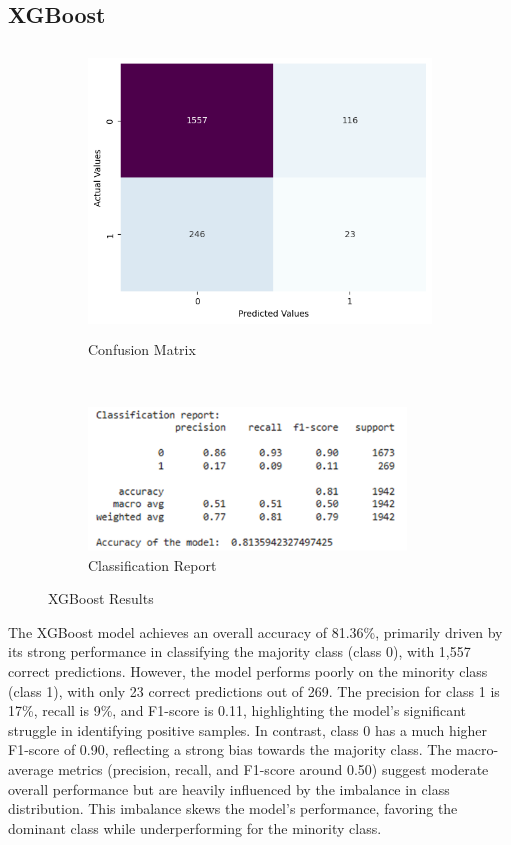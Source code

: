 \documentclass[12pt]{report}
\begin{document}
    \subsection{XGBoost}

    \begin{figure}[h!]
        \centering
        \begin{subfigure}[b]{0.5\textwidth}
            \centering
            \includegraphics[height=3in]{resources/pic/CM XGBoost.png}
            \caption{Confusion Matrix}
            \label{fig:XGBoost Confusion Matrix}
        \end{subfigure}%
        \\
        \begin{subfigure}[b]{0.4\textwidth}
            \centering
            \includegraphics[height=1.5in]{resources/pic/Report XGBoost.png}
            \caption{Classification Report}
            \label{fig:XGBoost Classification Report}
        \end{subfigure}
        \caption{XGBoost Results}
    \end{figure}

    The XGBoost model achieves an overall accuracy of 81.36\%, primarily driven by its strong performance in classifying the majority class (class 0), with 1,557 correct predictions. However, the model performs poorly on the minority class (class 1), with only 23 correct predictions out of 269. The precision for class 1 is 17\%, recall is 9\%, and F1-score is 0.11, highlighting the model's significant struggle in identifying positive samples. In contrast, class 0 has a much higher F1-score of 0.90, reflecting a strong bias towards the majority class. The macro-average metrics (precision, recall, and F1-score around 0.50) suggest moderate overall performance but are heavily influenced by the imbalance in class distribution. This imbalance skews the model's performance, favoring the dominant class while underperforming for the minority class.
\end{document}
